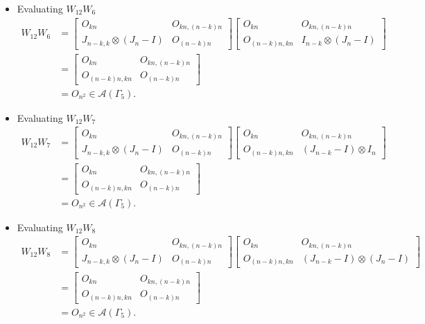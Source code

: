 \begin{itemize}
\item Evaluating $W_{12}W_{6}$
\begin{align*}
    W_{12}W_{6}
    &= \begin{bmatrix}
        O_{kn} & O_{kn, (n-k)n} \\
        J_{n-k, k}\otimes (J_n-I) & O_{(n-k)n}
    \end{bmatrix}
    \begin{bmatrix}
        O_{kn} & O_{kn, (n-k)n} \\
        O_{(n-k)n,kn} & I_{n-k} \otimes (J_n-I)
    \end{bmatrix}\\
    &= \begin{bmatrix}
        O_{kn} & O_{kn, (n-k)n} \\
        O_{(n-k)n,kn} & O_{(n - k)n}
    \end{bmatrix}\\
    &= O_{n^2} \in\mathcal{A}(\Gamma_5).
\end{align*}

\item Evaluating $W_{12}W_{7}$
\begin{align*}
    W_{12}W_{7}
    &= \begin{bmatrix}
        O_{kn} & O_{kn, (n-k)n} \\
        J_{n-k, k}\otimes (J_n-I) & O_{(n-k)n}
    \end{bmatrix}
    \begin{bmatrix}
        O_{kn} & O_{kn, (n-k)n} \\
        O_{(n-k)n,kn} & (J_{n-k}-I) \otimes I_n
    \end{bmatrix}\\
    &= \begin{bmatrix}
        O_{kn} & O_{kn, (n-k)n} \\
        O_{(n-k)n,kn} & O_{(n - k)n}
    \end{bmatrix}\\
    &= O_{n^2} \in\mathcal{A}(\Gamma_5).
\end{align*}

\item Evaluating $W_{12}W_{8}$
\begin{align*}
    W_{12}W_{8}
    &= \begin{bmatrix}
        O_{kn} & O_{kn, (n-k)n} \\
        J_{n-k, k}\otimes (J_n-I) & O_{(n-k)n}
    \end{bmatrix}
    \begin{bmatrix}
        O_{kn} & O_{kn, (n-k)n} \\
        O_{(n-k)n,kn} & (J_{n-k}-I) \otimes (J_n-I)
    \end{bmatrix}\\
    &= \begin{bmatrix}
        O_{kn} & O_{kn, (n-k)n} \\
        O_{(n-k)n,kn} & O_{(n - k)n}
    \end{bmatrix}\\
    &= O_{n^2} \in\mathcal{A}(\Gamma_5).
\end{align*}


\end{itemize}
